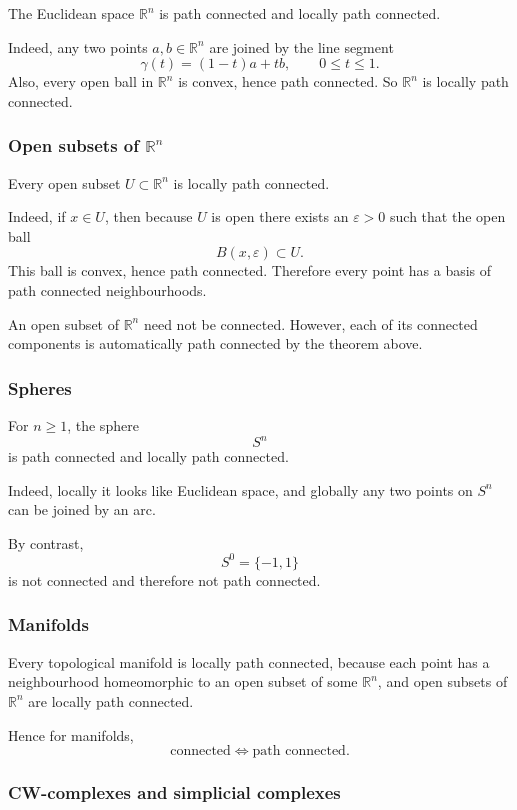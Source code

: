 \documentclass[12pt,a4paper]{article}
\theoremstyle{notespace}
\begin{document}
The Euclidean space \(\mathbb{R}^n\) is path connected and locally path connected.

Indeed, any two points \(a,b\in \mathbb{R}^n\) are joined by the line segment
\[
\gamma(t)=(1-t)a+tb,
\qquad
0\leq t\leq 1.
\]
Also, every open ball in \(\mathbb{R}^n\) is convex, hence path connected. So \(\mathbb{R}^n\) is locally path connected.

\subsubsection{Open subsets of \(\mathbb{R}^n\)}

Every open subset \(U\subset \mathbb{R}^n\) is locally path connected.

Indeed, if \(x\in U\), then because \(U\) is open there exists an \(\varepsilon>0\) such that the open ball
\[
B(x,\varepsilon)\subset U.
\]
This ball is convex, hence path connected. Therefore every point has a basis of path connected neighbourhoods.

An open subset of \(\mathbb{R}^n\) need not be connected. However, each of its connected components is automatically path connected by the theorem above.

\subsubsection{Spheres}

For \(n\geq 1\), the sphere
\[
S^n
\]
is path connected and locally path connected.

Indeed, locally it looks like Euclidean space, and globally any two points on \(S^n\) can be joined by an arc.

By contrast,
\[
S^0=\{-1,1\}
\]
is not connected and therefore not path connected.

\subsubsection{Manifolds}

Every topological manifold is locally path connected, because each point has a neighbourhood homeomorphic to an open subset of some \(\mathbb{R}^n\), and open subsets of \(\mathbb{R}^n\) are locally path connected.

Hence for manifolds,
\[
\text{connected} \iff \text{path connected}.
\]

\subsubsection{CW-complexes and simplicial complexes}
\end{document}
